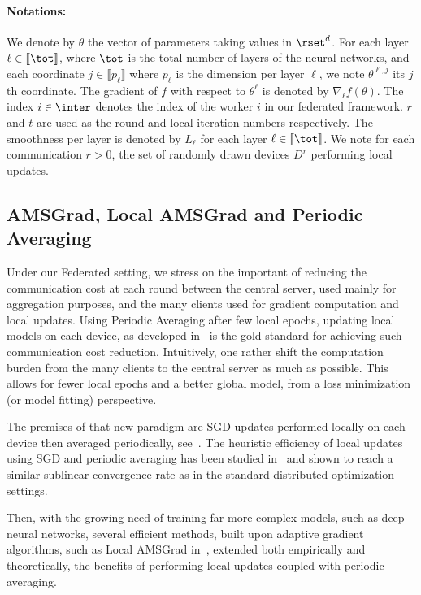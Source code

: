 \documentclass{article}
\begin{document}
\paragraph{Notations:} We denote by $\theta$ the vector of parameters taking values in $\rset^d$. 
For each layer $\ell \in \llbracket \tot \rrbracket$, where $\tot$ is the total number of layers of the neural networks, and each coordinate $j \in \llbracket p_\ell \rrbracket$ where $p_\ell$ is the dimension per layer $\ell$, we note $\theta^{\ell, j}$ its $j$th coordinate.
The gradient of $f$ with respect to $\theta^\ell$ is denoted by $\nabla_{\ell} f(\theta)$.
The index $i \in \inter$ denotes the index of the worker $i$ in our federated framework.
$r$ and $t$ are used as the round and local iteration numbers respectively.
The smoothness per layer is denoted by $L_\ell$ for each layer $\ell \in \llbracket \tot \rrbracket$.
We note for each communication $r>0$, the set of randomly drawn devices $D^{r}$ performing local updates.


\subsection{AMSGrad, Local AMSGrad and Periodic Averaging}
Under our Federated setting, we stress on the important of reducing the communication cost at each round between the central server, used mainly for aggregation purposes, and the many clients used for gradient computation and local updates.
Using Periodic Averaging after few local epochs, updating local models on each device, as developed in~\citet{mcmahan2017communication} is the gold standard for achieving such communication cost reduction.
Intuitively, one rather shift the computation burden from the many clients to the central server as much as possible. This allows for fewer local epochs and a better global model, from a loss minimization (or model fitting) perspective.

The premises of that new paradigm are SGD updates performed locally on each device then averaged periodically, see~\citet{konevcny2016federated, zhou2017convergence}.
The heuristic efficiency of local updates using SGD and periodic averaging has been studied in~\citet{stich2018local,yu2019linear} and shown to reach a similar sublinear convergence rate as in the standard distributed optimization settings.

Then, with the growing need of training far more complex models, such as deep neural networks, several efficient methods, built upon adaptive gradient algorithms, such as Local AMSGrad in~\citet{chen2020toward}, extended both empirically and theoretically, the benefits of performing local updates coupled with periodic averaging.
\end{document}
